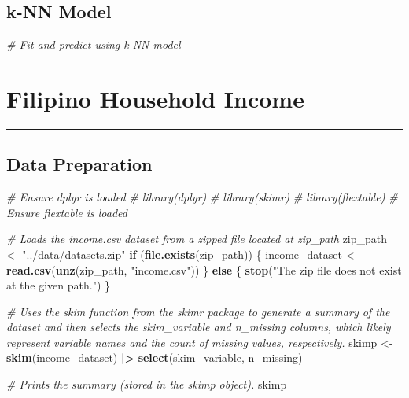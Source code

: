 \documentclass[
]{article}
\newenvironment{Shaded}{\begin{snugshade}}{\end{snugshade}}
\newcommand{\CommentTok}[1]{\textcolor[rgb]{0.56,0.35,0.01}{\textit{#1}}}
\newcommand{\ControlFlowTok}[1]{\textcolor[rgb]{0.13,0.29,0.53}{\textbf{#1}}}
\newcommand{\FunctionTok}[1]{\textcolor[rgb]{0.13,0.29,0.53}{\textbf{#1}}}
\newcommand{\NormalTok}[1]{#1}
\newcommand{\OtherTok}[1]{\textcolor[rgb]{0.56,0.35,0.01}{#1}}
\newcommand{\SpecialCharTok}[1]{\textcolor[rgb]{0.81,0.36,0.00}{\textbf{#1}}}
\newcommand{\StringTok}[1]{\textcolor[rgb]{0.31,0.60,0.02}{#1}}
\begin{document}
\subsection{k-NN Model}\label{k-nn-model}

\begin{Shaded}
\begin{Highlighting}[]
\CommentTok{\# Fit and predict using k{-}NN model}
\end{Highlighting}
\end{Shaded}

\section{Filipino Household Income}\label{filipino-household-income}

\begin{center}\rule{0.5\linewidth}{0.5pt}\end{center}

\subsection{Data Preparation}\label{data-preparation-1}

\begin{Shaded}
\begin{Highlighting}[]
\CommentTok{\# Ensure dplyr is loaded}
\CommentTok{\# library(dplyr)}
\CommentTok{\# library(skimr)}
\CommentTok{\# library(flextable)  \# Ensure flextable is loaded}
\end{Highlighting}
\end{Shaded}

\begin{Shaded}
\begin{Highlighting}[]
    \CommentTok{\# Loads the income.csv dataset from a zipped file located at zip\_path}
\NormalTok{zip\_path }\OtherTok{\textless{}{-}} \StringTok{"../data/datasets.zip"}
\ControlFlowTok{if}\NormalTok{ (}\FunctionTok{file.exists}\NormalTok{(zip\_path)) \{}
\NormalTok{income\_dataset }\OtherTok{\textless{}{-}} \FunctionTok{read.csv}\NormalTok{(}\FunctionTok{unz}\NormalTok{(zip\_path, }\StringTok{"income.csv"}\NormalTok{))}
\NormalTok{\} }\ControlFlowTok{else}\NormalTok{ \{}
  \FunctionTok{stop}\NormalTok{(}\StringTok{"The zip file does not exist at the given path."}\NormalTok{)}
\NormalTok{\}}

\CommentTok{\# Uses the skim function from the skimr package to generate a summary of the dataset and then selects the skim\_variable and n\_missing columns, which likely represent variable names and the count of missing values, respectively.}
\NormalTok{skimp }\OtherTok{\textless{}{-}} \FunctionTok{skim}\NormalTok{(income\_dataset) }\SpecialCharTok{|\textgreater{}}
  \FunctionTok{select}\NormalTok{(skim\_variable, n\_missing)}

\CommentTok{\# Prints the summary (stored in the skimp object).}
\NormalTok{skimp}
\end{Highlighting}
\end{Shaded}
\end{document}
